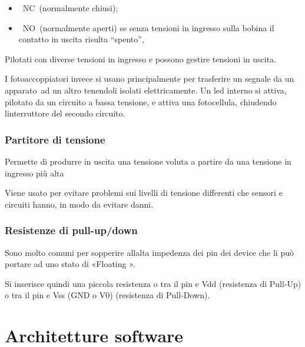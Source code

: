 \documentclass[
]{article}
\providecommand{\tightlist}{%
  \setlength{\itemsep}{0pt}\setlength{\parskip}{0pt}}
\begin{document}
\begin{itemize}
\tightlist
\item
  {~}{NC}{~(normalmente chiusi);}
\item
  {~}{NO}{~(normalmente aperti) se senza tensioni in ingresso sulla
  bobina il contatto in uscita risulta ``spento'', }
\end{itemize}

{Pilotati con diverse tensioni in ingresso e possono gestire tensioni in
uscita.}

{}

{I fotoaccoppiatori invece si usano principalmente per trasferire un
segnale da }{un apparato}{~ad un altro tenendoli isolati elettricamente.
Un led interno si attiva, pilotato da un circuito a bassa tensione, e
attiva una fotocellula, chiudendo l\textquotesingle interruttore del
secondo circuito.}

\subsubsection{\texorpdfstring{{Partitore di
tensione}}{Partitore di tensione}}\label{h.6w4lwn4qah2t}

{Permette di produrre in uscita una tensione voluta a partire da una
tensione in ingresso più alta}

{}

{Viene usato per evitare problemi sui livelli di tensione differenti che
sensori e circuiti hanno, in modo da evitare danni.}

\subsubsection{\texorpdfstring{{Resistenze di
pull-up/down}}{Resistenze di pull-up/down}}\label{h.k07th63a7hgj}

{Sono molto comuni per sopperire all\textquotesingle alta impedenza dei
pin dei device che li può portare ad uno stato di «Floating ». }

{Si inserisce quindi una piccola resistenza o tra il pin e Vdd
(resistenza di Pull-Up) o tra il pin e Vss (GND o V0) (resistenza di
Pull-Down).}

{}

{}

\section{\texorpdfstring{{Architetture
software}}{Architetture software}}\label{h.sn0or1jfjn6r}
\end{document}
